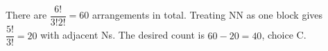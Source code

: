 There are $\dfrac{6!}{3!2!}=60$ arrangements in total. Treating NN as one block gives $\dfrac{5!}{3!}=20$ with adjacent Ns. The desired count is $60-20=\boxed{40}$, choice C.
